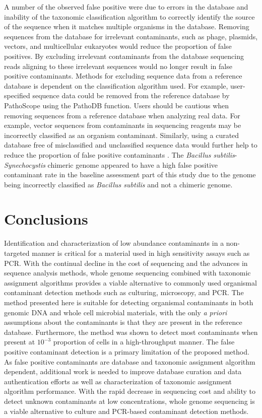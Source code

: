 \documentclass[fleqn,10pt,lineno]{wlpeerj}\usepackage[]{graphicx}\usepackage[]{color}
\begin{document}
A number of the observed false positive were due to errors in the database and inability of the taxonomic classification algorithm to correctly identify the source of the sequence when it matches multiple organisms in the database. 
Removing sequences from the database for irrelevant contaminants, such as phage, plasmids, vectors, and multicellular eukaryotes would reduce the proportion of false positives.
By excluding irrelevant contaminants from the database sequencing reads aligning to these irrelevant sequences would no longer result in false positive contaminants.
Methods for excluding sequence data from a reference database is dependent on the classification algorithm used.
For example, user-specified sequence data could be removed from the reference database by PathoScope using the PathoDB function.
Users should be cautious when removing sequences from a reference database when analyzing real data.
For example, vector sequences from contaminants in sequencing reagents may be incorrectly classified as an organism contaminant.
Similarly, using a curated database free of misclassified and unclassified sequence data would further help to reduce the proportion of false positive contaminants \citep{tennessen2015prodege}.
The \textit{Bacillus subtilis}-\textit{Synechocystis} chimeric genome appeared to have a high false positive contaminant rate in the baseline assessment part of this study due to the genome being incorrectly classified as \textit{Bacillus subtilis} and not a chimeric genome.


\section*{Conclusions}
Identification and characterization of low abundance contaminants in a non-targeted manner is critical for a material used in high sensitivity assays such as PCR.
With the continual decline in the cost of sequencing and the advances in sequence analysis methods, whole genome sequencing combined with taxonomic assignment algorithms provides a viable alternative to commonly used organismal contaminant detection methods such as culturing, microscopy, and PCR.
The method presented here is suitable for detecting organismal contaminants in both genomic DNA and whole cell microbial materials, with the only \textit{a priori} assumptions about the contaminants is that they are present in the reference database. 
Furthermore, the method was shown to detect most contaminants when present at $10^{-3}$ proportion of cells in a high-throughput manner.
The false positive contaminant detection is a primary limitation of the proposed method. 
As false positive contaminants are database and taxonomic assignment algorithm dependent, additional work is needed to improve database curation and data authentication efforts as well as characterization of taxonomic assignment algorithm performance.
With the rapid decrease in sequencing cost and ability to detect unknown contaminants at low concentrations, whole genome sequencing is a viable alternative to culture and PCR-based contaminant detection methods.
\end{document}
